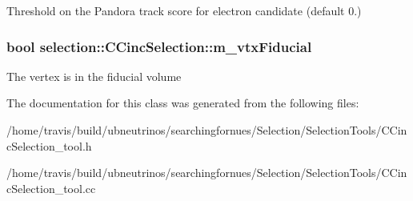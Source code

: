 Threshold on the Pandora track score for electron candidate (default 0.) \hypertarget{classselection_1_1CCincSelection_a0f08b768b994a2b2798a54a1b11cfaef}{
\subsubsection[{m\-\_\-vtx\-Fiducial}]{\setlength{\rightskip}{0pt plus 5cm}bool selection\-::\-C\-Cinc\-Selection\-::m\-\_\-vtx\-Fiducial\hspace{0.3cm}{\ttfamily [private]}}}\label{classselection_1_1CCincSelection_a0f08b768b994a2b2798a54a1b11cfaef}
The vertex is in the fiducial volume 

The documentation for this class was generated from the following files\-:\begin{DoxyCompactItemize}
\item 
/home/travis/build/ubneutrinos/searchingfornues/\-Selection/\-Selection\-Tools/C\-Cinc\-Selection\-\_\-tool.\-h\item 
/home/travis/build/ubneutrinos/searchingfornues/\-Selection/\-Selection\-Tools/C\-Cinc\-Selection\-\_\-tool.\-cc\end{DoxyCompactItemize}
